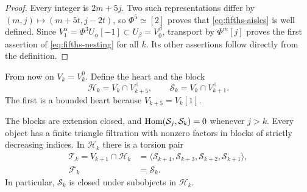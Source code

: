 \begin{proof}
Every integer is $2m+5j$.  Two such representations differ by
$(m,j)\mapsto(m+5t,j-2t)$, so $\Phi^5\simeq[2]$ proves that
\eqref{eq:fifths-aisles} is well defined.  Since
$V_1^\alpha=\Phi^3U_\alpha[-1]\subset U_\beta=V_0^\beta$,
transport by $\Phi^m[j]$ proves the first assertion of
\eqref{eq:fifths-nesting} for all $k$.  Its other assertions follow
directly from the definition.
\end{proof}

From now on $V_k=V_k^0$.  Define the heart and the block
\begin{equation}\label{eq:block-definitions}
 \mathcal H_k=V_k\cap V_{k+5}^\perp,
 \qquad \mathcal S_k=V_k\cap V_{k+1}^\perp.
\end{equation}
The first is a bounded heart because $V_{k+5}=V_k[1]$.

\begin{lemma}\label{lem:block-filtrations}
The blocks are extension closed, and
$\operatorname{Hom}(\mathcal S_j,\mathcal S_k)=0$ whenever $j>k$.
Every object has a finite triangle filtration with nonzero factors in
blocks of strictly decreasing indices.  In $\mathcal H_k$ there is a
torsion pair
\begin{equation}\label{eq:block-torsion-pair}
 \begin{aligned}
 \mathcal T_k=V_{k+1}\cap\mathcal H_k
     &=\langle\mathcal S_{k+4},\mathcal S_{k+3},
                \mathcal S_{k+2},\mathcal S_{k+1}\rangle,\\
 \mathcal F_k&=\mathcal S_k.
 \end{aligned}
\end{equation}
In particular, $\mathcal S_k$ is closed under subobjects in $\mathcal H_k$.
\end{lemma}

